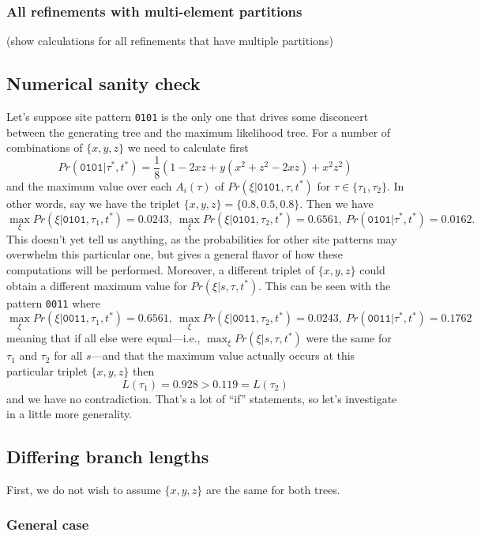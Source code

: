 \documentclass[a4paper]{article}
\begin{document}
\subsubsection{All refinements with multi-element partitions}

(show calculations for all refinements that have multiple partitions)

\subsection{Numerical sanity check}

Let's suppose site pattern \texttt{0101} is the only one that drives some disconcert between the generating tree and the maximum likelihood tree.
For a number of combinations of $\{x,y,z\}$ we need to calculate first
$$
Pr(\texttt{0101} | \tau^*, t^*) = \frac{1}{8}(1-2xz+y(x^2+z^2-2xz)+x^2z^2)
$$
and the maximum value over each $A_i(\tau)$ of $Pr(\xi | \texttt{0101}, \tau, t^*)$ for $\tau\in\{\tau_1, \tau_2\}$.
In other words, say we have the triplet $\{x,y,z\}=\{0.8,0.5,0.8\}$.
Then we have
$$
\max_{\xi} Pr(\xi | \texttt{0101}, \tau_1, t^*) = 0.0243, \ \max_{\xi} Pr(\xi | \texttt{0101}, \tau_2, t^*) = 0.6561, \ Pr(\texttt{0101} | \tau^*, t^*) = 0.0162.
$$
This doesn't yet tell us anything, as the probabilities for other site patterns may overwhelm this particular one, but gives a general flavor of how these computations will be performed.
Moreover, a different triplet of $\{x,y,z\}$ could obtain a different maximum value for $Pr(\xi | s, \tau, t^*)$.
This can be seen with the pattern \texttt{0011} where
$$
\max_{\xi} Pr(\xi | \texttt{0011}, \tau_1, t^*) = 0.6561, \ \max_{\xi} Pr(\xi | \texttt{0011}, \tau_2, t^*) = 0.0243, \ Pr(\texttt{0011} | \tau^*, t^*) = 0.1762
$$
meaning that if all else were equal---i.e., $\max_{\xi} Pr(\xi | s, \tau, t^*)$ were the same for $\tau_1$ and $\tau_2$ for all $s$---and that the maximum value actually occurs at this particular triplet $\{x,y,z\}$ then
$$
L(\tau_1) = 0.928 > 0.119 = L(\tau_2)
$$
and we have no contradiction.
That's a lot of ``if'' statements, so let's investigate in a little more generality.

\subsection{Differing branch lengths}

First, we do not wish to assume $\{x,y,z\}$ are the same for both trees.

\subsubsection{General case}
\end{document}
